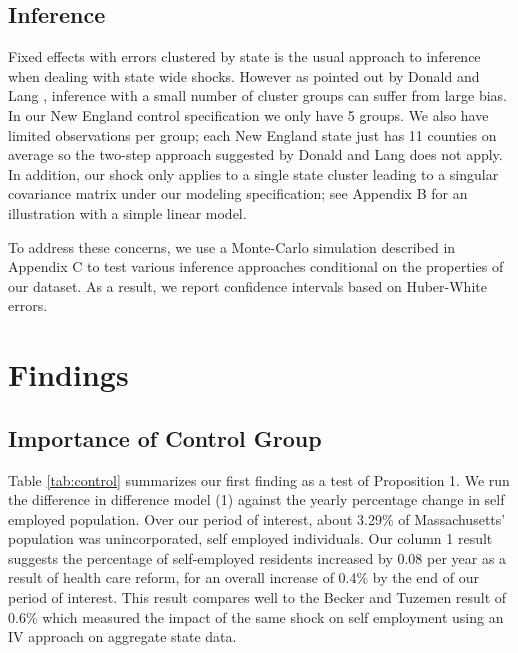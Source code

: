 \documentclass[12pt]{article}
\begin{document}
\begin{comment}
\begin{figure}[H]
	\centering
	\begin{subfigure}[b]{0.495\textwidth}
		\texttt{[image: resources/graphpoint\_diff\_ne\_pop\_ddd\_synth]}
		\caption{Non-Employers}
	\end{subfigure}
		\begin{subfigure}[b]{0.495\textwidth}
		\texttt{[image: resources/graphpoint\_diff\_em\_pop\_ddd\_synth]}
		\caption{Small businesses}
	\end{subfigure}
	\caption{Treatment Effect of triple difference model with synthetic control}
\end{figure}
\end{comment}

\subsection{Inference}

Fixed effects with errors clustered by state is the usual approach to inference when dealing with state wide shocks. However as pointed out by Donald and Lang \cite{donald}, inference with a small number of cluster groups can suffer from large bias. In our New England control specification we only have 5 groups. We also have limited observations per group; each New England state just has 11 counties on average so the two-step approach suggested by Donald and Lang does not apply. In addition, our shock only applies to a single state cluster leading to a singular covariance matrix under our modeling specification; see Appendix B for an illustration with a simple linear model. 

To address these concerns, we use a Monte-Carlo simulation described in Appendix C to test various inference approaches conditional on the properties of our dataset. As a result, we report confidence intervals based on Huber-White errors. 

\section{Findings}
\label{sec:results}

\subsection{Importance of Control Group}

Table \ref{tab:control} summarizes our first finding as a test of Proposition 1. We run the difference in difference model (1) against the yearly percentage change in self employed population. Over our period of interest, about 3.29\% of Massachusetts' population was unincorporated, self employed individuals. Our column 1 result suggests the percentage of self-employed residents increased by 0.08 per year as a result of health care reform, for an overall increase of 0.4\% by the end of our period of interest. This result compares well to the Becker and Tuzemen \cite{tuzemen} result of 0.6\% which measured the impact of the same shock on self employment using an IV approach on aggregate state data. 
\end{document}
